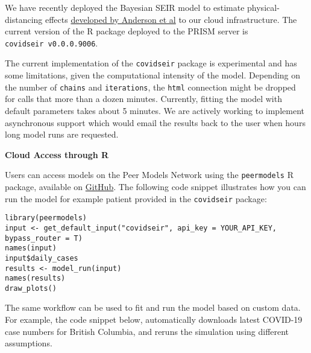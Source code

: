 \documentclass[
]{book}
\begin{document}
We have recently deployed the Bayesian SEIR model to estimate physical-distancing effects \href{https://doi.org/10.1101/2020.04.17.20070086}{developed by Anderson et al} to our cloud infrastructure. The current version of the R package deployed to the PRISM server is \texttt{covidseir\ v0.0.0.9006}.

The current implementation of the \texttt{covidseir} package is experimental and has some limitations, given the computational intensity of the model. Depending on the number of \texttt{chains} and \texttt{iterations}, the \texttt{html} connection might be dropped for calls that more than a dozen minutes.
Currently, fitting the model with default parameters takes about 5 minutes. We are actively working to implement asynchronous support which would email the results back to the user when hours long model runs are requested.

\textbf{Cloud Access through R}

Users can access models on the Peer Models Network using the \texttt{peermodels} R package, available on \href{https://github.com/resplab/peermodels}{GitHub}. The following code snippet illustrates how you can run the model for example patient provided in the \texttt{covidseir} package:

\begin{verbatim}
library(peermodels)
input <- get_default_input("covidseir", api_key = YOUR_API_KEY, bypass_router = T)
names(input)
input$daily_cases
results <- model_run(input)
names(results)
draw_plots()
\end{verbatim}

The same workflow can be used to fit and run the model based on custom data. For example, the code snippet below, automatically downloads latest COVID-19 case numbers for British Columbia, and reruns the simulation using different assumptions.
\end{document}
